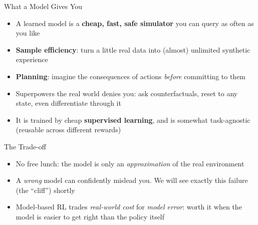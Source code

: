 \begin{frame}{What a Model Gives You}
\begin{itemize}
    \item A learned model is a \textbf{cheap, fast, safe simulator} you can query
          as often as you like
    \item \textbf{Sample efficiency}: turn a little real data into (almost)
          unlimited synthetic experience
    \item \textbf{Planning}: imagine the consequences of actions \emph{before}
          committing to them
    \item Superpowers the real world denies you: ask counterfactuals, reset to
          any state, even differentiate through it
    \item It is trained by cheap \textbf{supervised learning}, and is somewhat
          task-agnostic (reusable across different rewards)
\end{itemize}
\end{frame}

\begin{frame}{The Trade-off}
\begin{itemize}
    \item No free lunch: the model is only an \emph{approximation} of the real
          environment
    \item A \emph{wrong} model can confidently mislead you. We will see exactly
          this failure (the ``cliff'') shortly
    \item Model-based RL trades \emph{real-world cost} for \emph{model error}:
          worth it when the model is easier to get right than the policy itself
\end{itemize}
\end{frame}
